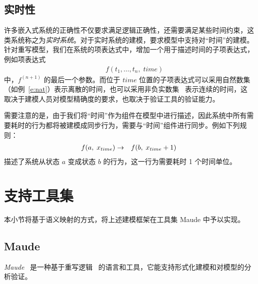 \subsection{实时性}
\label{ss:realtime-modeling}

许多嵌入式系统的正确性不仅要求满足逻辑正确性，还需要满足某些时间约束，这类系统称之为\emph{实时系统}。对于实时系统的建模，要求模型中支持对“时间”的建模。针对重写模型，我们在系统的项表达式中，增加一个用于描述时间的子项表达式，例如项表达式
\begin{eqnarray}
& & f(t_1,\ldots,t_n,\; time) \nonumber
\end{eqnarray}
中，$f^{(n+1)}$ 的最后一个参数。而位于 $time$ 位置的子项表达式可以采用自然数集（如例~\ref{e:nat}）表示离散的时间，也可以采用非负实数集~\cite{DBLP:journals/tcs/GoguenM92} 表示连续的时间，这取决于建模人员对模型精确度的要求，也取决于验证工具的验证能力。

需要注意的是，由于我们将“时间”作为组件在模型中进行描述，因此系统中所有需要耗时的行为都将被建模成同步行为，需要与“时间”组件进行同步。例如下列规则：
\begin{eqnarray}
f(a,\; x_{time}) & \rightarrow & f(b,\; x_{time}+1) \nonumber
\end{eqnarray}
描述了系统从状态 $a$ 变成状态 $b$ 的行为，这一行为需要耗时 1 个时间单位。

\section{支持工具集}
\label{s:tool}

本小节将基于语义映射的方式，将上述建模框架在工具集 Maude 中予以实现。

\subsection{Maude}

\emph{Maude}~\cite{DBLP:journals/tcs/ClavelDELMMQ02} 是一种基于重写逻辑~\cite{DBLP:journals/jlp/Meseguer12} 的语言和工具，它能支持形式化建模和对模型的分析验证。

